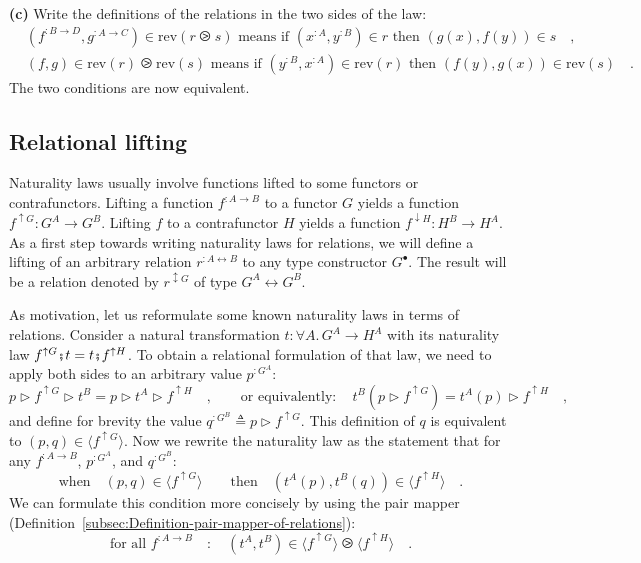 \textbf{(c)} Write the definitions of the relations in the two sides
of the law:
\begin{align*}
 & (f^{:B\rightarrow D},g^{:A\rightarrow C})\in\text{rev}\left(r\ogreaterthan s\right)\text{ means if }(x^{:A},y^{:B})\in r\text{ then }(g(x),f(y))\in s\quad,\\
 & (f,g)\in\text{rev}\left(r\right)\ogreaterthan\text{rev}\left(s\right)\text{ means if }(y^{:B},x^{:A})\in\text{rev}\left(r\right)\text{ then }(f(y),g(x))\in\text{rev}\left(s\right)\quad.
\end{align*}
The two conditions are now equivalent.

\subsection{Relational lifting}

Naturality laws usually involve functions lifted to some functors
or contrafunctors. Lifting a function $f^{:A\rightarrow B}$ to a
functor $G$ yields a function $f^{\uparrow G}:G^{A}\rightarrow G^{B}$.
Lifting $f$ to a contrafunctor $H$ yields a function $f^{\downarrow H}:H^{B}\rightarrow H^{A}$.
As a first step towards writing naturality laws for relations, we
will define a lifting of an arbitrary relation $r^{:A\leftrightarrow B}$
to any type constructor $G^{\bullet}$. The result will be a relation
denoted by $r^{\updownarrow G}$ of type $G^{A}\leftrightarrow G^{B}$.

As motivation, let us reformulate some known naturality laws in terms
of relations. Consider a natural transformation $t:\forall A.\,G^{A}\rightarrow H^{A}$
with its naturality law $f^{\uparrow G}\bef t=t\bef f^{\uparrow H}$.
To obtain a relational formulation of that law, we need to apply both
sides to an arbitrary value $p^{:G^{A}}$:
\[
p\triangleright f^{\uparrow G}\triangleright t^{B}=p\triangleright t^{A}\triangleright f^{\uparrow H}\quad,\quad\quad\text{or equivalently}:\quad t^{B}(p\triangleright f^{\uparrow G})=t^{A}(p)\triangleright f^{\uparrow H}\quad,
\]
and define for brevity the value $q^{:G^{B}}\triangleq p\triangleright f^{\uparrow G}$.
This definition of $q$ is equivalent to $(p,q)\in\langle f^{\uparrow G}\rangle$.
Now we rewrite the naturality law as the statement that for any $f^{:A\rightarrow B}$,
$p^{:G^{A}}$, and $q^{:G^{B}}$:
\[
\text{when}\quad(p,q)\in\langle f^{\uparrow G}\rangle\quad\quad\text{then}\quad(t^{A}(p),t^{B}(q))\in\langle f^{\uparrow H}\rangle\quad.
\]
We can formulate this condition more concisely by using the pair mapper
(Definition~\ref{subsec:Definition-pair-mapper-of-relations}):
\[
\text{for all }f^{:A\rightarrow B}\quad:\quad(t^{A},t^{B})\in\langle f^{\uparrow G}\rangle\ogreaterthan\langle f^{\uparrow H}\rangle\quad.
\]

